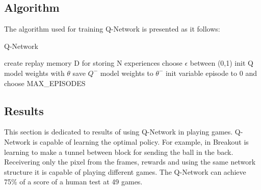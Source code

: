 \subsection{Algorithm}
The algorithm\cite{nature} used for training Q-Network is presented as it follows:
\begin{algorithm}
	\caption{Q-Network} \label{sgd-code}
	\begin{algorithmic}[1]
		\State create replay memory D for storing N experiences
		\State choose $\epsilon$ between (0,1)
		\State init Q model weights with $\theta$
		\State save $Q^-$ model weights to $\theta^-$
		\State init variable episode to 0 and choose MAX_EPISODES
		\EndWhile

		
	\end{algorithmic}
\end{algorithm}

\newpage


\subsection{Results}

This section is dedicated to results of using Q-Network\cite{nature} in playing games.
Q-Network is capable of learning the optimal policy. For example, in Breakout is learning to make a tunnel between block for sending the ball in the back. Receivering only the pixel from the frames, rewards and using the same network structure it is capable of playing different games. The Q-Network can achieve 75\% of a score of a human test at 49 games.


